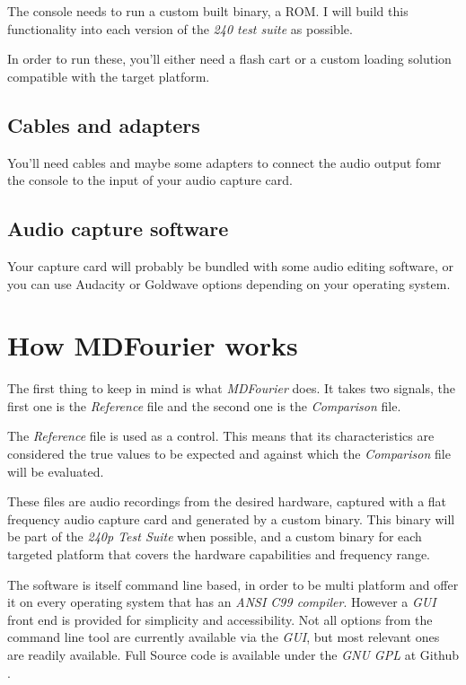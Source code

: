 \documentclass[10pt,a4paper]{report}
\begin{document}
The console needs to run a custom built binary, a ROM. I will build this functionality into each version of the \textit{240 test suite}\cite{240pSuite} as possible.

In order to run these, you'll either need a flash cart or a custom loading solution compatible with the target platform.

\section{Cables and adapters}

You'll need cables and maybe some adapters to connect the audio output fomr the console to the input of your audio capture card.

\section{Audio capture software}

Your capture card will probably be bundled with some audio editing software, or you can use  Audacity\cite{audacity} or Goldwave\cite{goldwave} options depending on your operating system.

\chapter{How MDFourier works}
\label{howitworks}

The first thing to keep in mind is what \textit{MDFourier} does. It takes two signals, the first one is the \textit{Reference} file and the second one is the \textit{Comparison} file.

The \textit{Reference} file is used as a control. This means that its characteristics are considered the true values to be expected and against which the \textit{Comparison} file will be evaluated.

These files are audio recordings from the desired hardware, captured with a flat frequency audio capture card and generated by a custom binary. This binary will be part of the \textit{240p Test Suite}\cite{240pSuite} when possible, and a custom binary for each targeted platform that covers the hardware capabilities and frequency range.

The software is itself command line based, in order to be multi platform and offer it on every operating system that has an \textit{ANSI C99 compiler}. However a \textit{GUI} front end is provided for simplicity and accessibility. Not all options from the command line tool are currently available via the \textit{GUI}, but most relevant ones are readily available. Full Source code is available under the \textit{GNU GPL} at Github \cite{sourcecode}.
\end{document}

